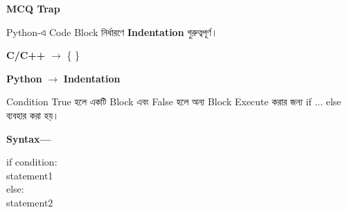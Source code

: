 \begin{rememberbox}

\textbf{\color{deepOrange}MCQ Trap}

Python-এ Code Block নির্ধারণে
\textbf{Indentation} গুরুত্বপূর্ণ।

\begin{center}

\textbf{C/C++}
\(\longrightarrow\)
\textenglish{\ttfamily \{ \}}

\qquad

\textbf{Python}
\(\longrightarrow\)
\textbf{Indentation}

\end{center}

\end{rememberbox}



Condition True হলে একটি Block এবং False হলে অন্য Block
Execute করার জন্য
\textenglish{\ttfamily if ... else}
ব্যবহার করা হয়।

\textbf{Syntax—}

\begin{codebox}
\begin{english}
\ttfamily
if condition:\\
\hspace*{4mm}statement1\\
else:\\
\hspace*{4mm}statement2
\end{english}
\end{codebox}

